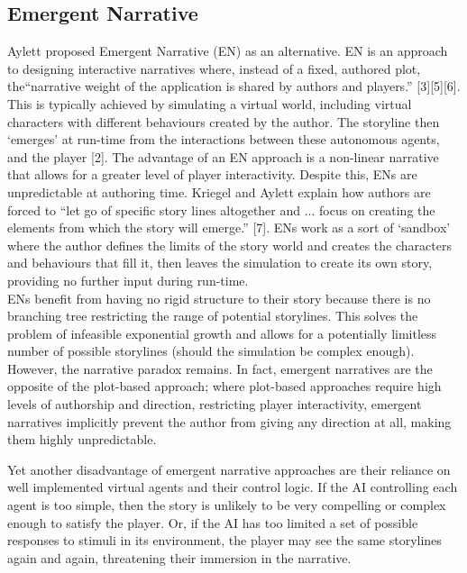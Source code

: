 \documentclass{sig-alternate-05-2015}
\begin{document}
\subsection{Emergent Narrative}

Aylett proposed Emergent Narrative (EN) as an alternative. EN is an approach to designing interactive narratives where, instead of a fixed, authored plot, the``narrative weight of the application is shared by authors and players.'' [3][5][6]. This is typically achieved by simulating a virtual world, including virtual characters with different behaviours created by the author. The storyline then `emerges' at run-time from the interactions between these autonomous agents, and the player [2]. The advantage of an EN approach is a non-linear narrative that allows for a greater level of player interactivity. Despite this, ENs are unpredictable at authoring time. Kriegel and Aylett explain how authors are forced to ``let go of specific story lines altogether and ... focus on creating the elements from which the story will emerge.'' [7]. ENs work as a sort of `sandbox' where the author defines the limits of the story world and creates the characters and behaviours that fill it, then leaves the simulation to create its own story, providing no further input during run-time.\\

\noindent ENs benefit from having no rigid structure to their story because there is no branching tree restricting the range of potential storylines. This solves the problem of infeasible exponential growth and allows for a potentially limitless number of possible storylines (should the simulation be complex enough). However, the narrative paradox remains. In fact, emergent narratives are the opposite of the plot-based approach; where plot-based approaches require high levels of authorship and direction, restricting player interactivity, emergent narratives implicitly prevent the author from giving any direction at all, making them highly unpredictable.

Yet another disadvantage of emergent narrative approaches are their reliance on well implemented virtual agents and their control logic. If the AI controlling each agent is too simple, then the story is unlikely to be very compelling or complex enough to satisfy the player. Or, if the AI has too limited a set of possible responses to stimuli in its environment, the player may see the same storylines again and again, threatening their immersion in the narrative.
\end{document}
